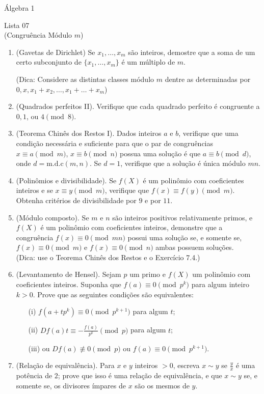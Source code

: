 \documentclass[a4paper,12pt]{article}
\begin{document}
\begin{center}
    \large Álgebra 1
\end{center}

\begin{center}
    \large Lista 07 \\
    \small (Congruência Módulo $m$)
\end{center}

  \begin{enumerate}[label=7.\arabic*.]
    \item (Gavetas de Dirichlet) Se $x_1,\ldots,x_m$ são inteiros, demostre que a soma de um certo subconjunto
    de $\{x_1,\ldots,x_m\}$ é um múltiplo de $m$.

    (Dica: Considere as distintas classes módulo $m$ dentre as determinadas por $0, x, x_1 + x_2, \ldots , x_1 + \ldots + x_m$)

    \item (Quadrados perfeitos II). Verifique que cada quadrado perfeito é congruente a 
    $0, 1$, ou $4 \pmod{8}$.

    \item (Teorema Chinês dos Restos I). Dados inteiros $a$ e $b$, verifique que uma condição 
    necessária e suficiente para que o par de congruências $x \equiv a \pmod{m}$, 
    $x \equiv b \pmod{n}$ possua uma solução é que $a \equiv b \pmod{d}$, onde $d = \text{m.d.c}(m,n)$. Se $d = 1$, 
    verifique que a solução é única módulo $mn$.

    \item (Polinômios e divisibilidade). Se $f(X)$ é um polinômio com coeficientes inteiros 
    e se $x \equiv y \pmod{m}$, verifique que $f(x) \equiv f(y) \pmod{m}$. Obtenha critérios de 
    divisibilidade por $9$ e por $11$.

    \item (Módulo composto). Se $m$ e $n$ são inteiros positivos relativamente primos, e $f(X)$ 
    é um polinômio com coeficientes inteiros, demonstre que a congruência 
    $f(x) \equiv 0 \pmod{mn}$ possui uma solução se, e somente se, $f(x) \equiv 0 \pmod{m}$ e 
    $f(x) \equiv 0 \pmod{n}$ ambas possuem soluções. \\
    (Dica: use o Teorema Chinês dos Restos e o Exercício 7.4.)

    \item (Levantamento de Hensel). Sejam $p$ um primo e $f(X)$ um polinômio com coeficientes 
    inteiros. Suponha que $f(a) \equiv 0 \pmod{p^k}$ para algum inteiro $k>0$. Prove que as 
    seguintes condições são equivalentes:
    \begin{enumerate}
        \item[(i)] $f(a + tp^k) \equiv 0 \pmod{p^{k+1}}$ para algum $t$;
        \item[(ii)] $Df(a)t \equiv -\frac{f(a)}{p^k} \pmod{p}$ para algum $t$;
        \item[(iii)] ou $Df(a) \not\equiv 0 \pmod{p}$ ou $f(a) \equiv 0 \pmod{p^{k+1}}$.
    \end{enumerate}

    \item (Relação de equivalência). Para $x$ e $y$ inteiros $>0$, escreva $x \sim y$ se $\frac{y}{x}$ é uma potência 
    de $2$; prove que isso é uma relação de equivalência, e que $x \sim y$ se, e somente se, 
    os divisores ímpares de $x$ são os mesmos de $y$.

  \end{enumerate}
\end{document}
